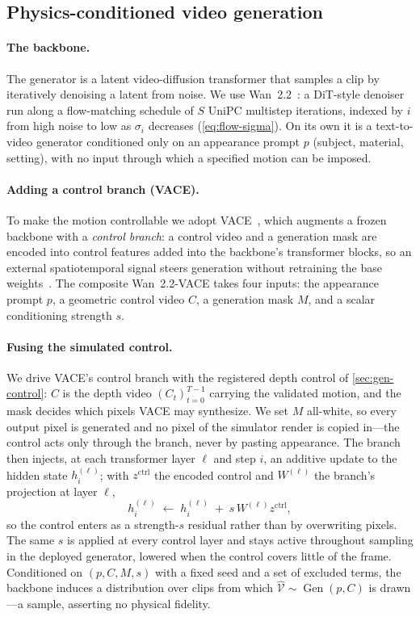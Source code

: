 \subsection{Physics-conditioned video generation}\label{sec:gen-mechanism}

\paragraph{The backbone.} The generator is a latent video-diffusion transformer that samples a clip
by iteratively denoising a latent from noise. We use Wan~2.2~\cite{wan2025}: a DiT-style denoiser run
along a flow-matching schedule of $S$ UniPC multistep iterations, indexed by $i$ from high noise to
low as $\sigma_i$ decreases (\cref{eq:flow-sigma}). On its own it is a text-to-video generator
conditioned only on an appearance prompt $p$ (subject, material, setting), with no input through which
a specified motion can be imposed.

\paragraph{Adding a control branch (VACE).} To make the motion controllable we adopt
VACE~\cite{vace2025}, which augments a frozen backbone with a \emph{control branch}: a control video
and a generation mask are encoded into control features added into the backbone's transformer blocks,
so an external spatiotemporal signal steers generation without retraining the base
weights~\cite{zhang2023controlnet,wang2023videocomposer}. The composite Wan~2.2-VACE takes four
inputs: the appearance prompt $p$, a geometric control video $C$, a generation mask $M$, and a scalar
conditioning strength $s$.

\paragraph{Fusing the simulated control.} We drive VACE's control branch with the registered depth
control of \cref{sec:gen-control}: $C$ is the depth video $(C_t)_{t=0}^{T-1}$ carrying the validated
motion, and the mask decides which pixels VACE may synthesize. We set $M$ all-white, so every output
pixel is generated and no pixel of the simulator render is copied in---the control acts only through
the branch, never by pasting appearance. The branch then injects, at each transformer layer $\ell$ and
step $i$, an additive update to the hidden state $h_i^{(\ell)}$; with $z^{\mathrm{ctrl}}$ the encoded
control and $W^{(\ell)}$ the branch's projection at layer $\ell$,
\begin{equation}
h_i^{(\ell)} \;\leftarrow\; h_i^{(\ell)} \;+\; s\,W^{(\ell)}z^{\mathrm{ctrl}},
\label{eq:control-release}
\end{equation}
so the control enters as a strength-$s$ residual rather than by overwriting pixels. The same $s$ is
applied at every control layer and stays active throughout sampling in the deployed generator, lowered
when the control covers little of the frame. Conditioned on $(p,C,M,s)$ with a fixed seed and a set of
excluded terms, the backbone induces a distribution over clips from which
$\hat{\mathcal{V}}\sim\operatorname{Gen}(p,C)$ is drawn---a sample, asserting no physical fidelity.

